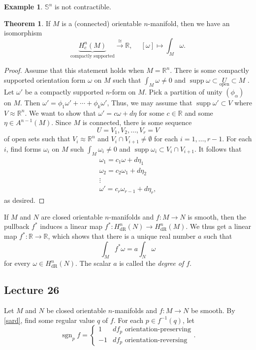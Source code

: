 \documentclass[10pt,letterpaper,cm]{nupset}
\theoremstyle{definition}
\newtheorem{exmp}[definition]{Example}
\theoremstyle{theorem}
\newtheorem{theorem}[definition]{Theorem}
\theoremstyle{remark}
\newcommand{\R}{\mathbb R}
\renewcommand{\S}{\mathbb S}
\newcommand{\1}{\mathbf{1}}
\newcommand{\0}{\vec 0}
\DeclareMathOperator{\supp}{supp}
\DeclareMathOperator{\dr}{dR}
\DeclareMathOperator{\sgn}{sgn}
\begin{document}
\begin{exmp}
$\S^n$ is not contractible.
\end{exmp}

\begin{theorem}
If $M$ is a (connected) orientable $n$-manifold, then we have an isomorphism $$\underbrace{H_c^n(M)}_{\text{compactly supported}} \overset{\cong}{\longrightarrow} \R,\ \quad [\omega] \mapsto \int_M \omega.$$
\end{theorem}
\begin{proof}
Assume that this statement holds when $M = \R^n$. There is some compactly supported orientation form $\omega$ on $M$ such that $\int_M \omega \ne 0$ and $\supp \omega \subset \underset{\text{open}}{U}\subset M$ . Let $\omega'$ be a compactly supported $n$-form on $M$. Pick a partition of unity $(\phi_{\alpha})$ on $M$. Then $\omega' =\phi_1\omega' +\cdots + \phi_k \omega'$, Thus, we may assume  that $\supp \omega' \subset V$ where $V \approx \R^n$. We want to show that $\omega' =c\omega + d\eta$ for some $c\in \R$ and some $\eta \in A^{n-1}(M)$. Since $M$ is connected, there is some sequence $$U=V_1, V_2, \ldots, V_r=V$$ of open sets such that $V_i\approx \R^n$ and $V_i\cap V_{i+1} \ne \emptyset$ for each $i=1, \ldots, r-1$. For each $i$, find forms $\omega_i$ on $M$ such $\int_M \omega_i \ne 0$ and $\supp \omega_i \subset V_i \cap V_{i+1}$.  It follows that 
\begin{gather*}
 \omega_1  = c_1\omega + d\eta_1
\\ \omega_2  = c_2\omega_1+ d\eta_2
\\  \vdots
\\  \omega'  =  c_r\omega_{r-1}+d\eta_r
, \end{gather*} as desired.
\end{proof}

If $M$ and $N$ are closed orientable $n$-manifolds and $f: M \to N$ is smooth, then the pullback $f^{\ast}$ induces a linear map $f^{\ast}: H_{\dr}^n(N) \to H_{\dr}^n(M)$. We thus get a linear map $f^{\ast} : \R \to \R$, which shows that there is a unique  real number $a$ such that 
\[
\int_{M} f^{\ast} \omega = a\int_N \omega
\]
 for every $\omega \in H_{\dr}^n(N) $. The scalar $a$ is called the \textit{degree of $f$}. 

\subsection{Lecture 26}

Let $M$ and $N$ be closed orientable $n$-manifolds and $f: M \to N$ be smooth. By \cref{sard}, find some regular value $q$ of $f$. For each $p\in f^{-1}(q)$, let 
$$ \sgn_pf = \begin{cases}
1 & df_p \text{ orientation-preserving} 
\\ {-1}  & df_p \text{ orientation-reversing} \end{cases}.$$ 
\end{document}
